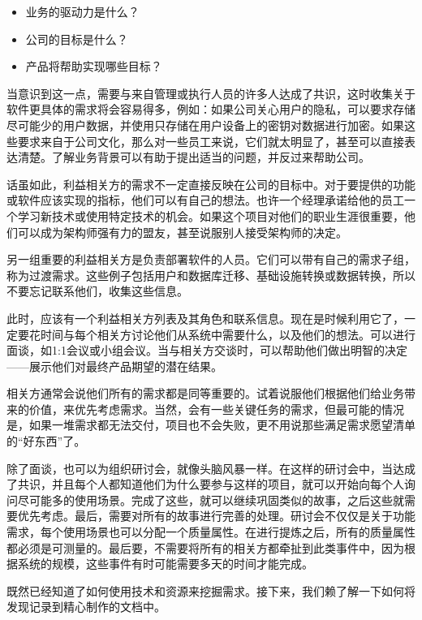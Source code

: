 \begin{itemize}
\item 
业务的驱动力是什么？

\item 
公司的目标是什么？

\item 
产品将帮助实现哪些目标？
\end{itemize}

当意识到这一点，需要与来自管理或执行人员的许多人达成了共识，这时收集关于软件更具体的需求将会容易得多，例如：如果公司关心用户的隐私，可以要求存储尽可能少的用户数据，并使用只存储在用户设备上的密钥对数据进行加密。如果这些要求来自于公司文化，那么对一些员工来说，它们就太明显了，甚至可以直接表达清楚。了解业务背景可以有助于提出适当的问题，并反过来帮助公司。

话虽如此，利益相关方的需求不一定直接反映在公司的目标中。对于要提供的功能或软件应该实现的指标，他们可以有自己的想法。也许一个经理承诺给他的员工一个学习新技术或使用特定技术的机会。如果这个项目对他们的职业生涯很重要，他们可以成为架构师强有力的盟友，甚至说服别人接受架构师的决定。

另一组重要的利益相关方是负责部署软件的人员。它们可以带有自己的需求子组，称为过渡需求。这些例子包括用户和数据库迁移、基础设施转换或数据转换，所以不要忘记联系他们，收集这些信息。


此时，应该有一个利益相关方列表及其角色和联系信息。现在是时候利用它了，一定要花时间与每个相关方讨论他们从系统中需要什么，以及他们的想法。可以进行面谈，如1:1会议或小组会议。当与相关方交谈时，可以帮助他们做出明智的决定——展示他们对最终产品期望的潜在结果。

相关方通常会说他们所有的需求都是同等重要的。试着说服他们根据他们给业务带来的价值，来优先考虑需求。当然，会有一些关键任务的需求，但最可能的情况是，如果一堆需求都无法交付，项目也不会失败，更不用说那些满足需求愿望清单的“好东西”了。

除了面谈，也可以为组织研讨会，就像头脑风暴一样。在这样的研讨会中，当达成了共识，并且每个人都知道他们为什么要参与这样的项目，就可以开始向每个人询问尽可能多的使用场景。完成了这些，就可以继续巩固类似的故事，之后这些就需要优先考虑。最后，需要对所有的故事进行完善的处理。研讨会不仅仅是关于功能需求，每个使用场景也可以分配一个质量属性。在进行提炼之后，所有的质量属性都必须是可测量的。最后要，不需要将所有的相关方都牵扯到此类事件中，因为根据系统的规模，这些事件有时可能需要多天的时间才能完成。

既然已经知道了如何使用技术和资源来挖掘需求。接下来，我们赖了解一下如何将发现记录到精心制作的文档中。







